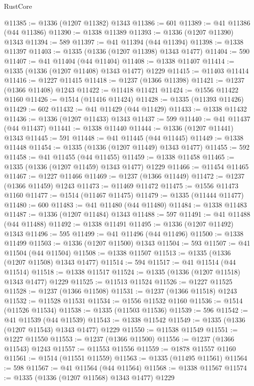 \begin{lexlean}{RustCore}
\begin{coremodule}
@11385 := @1336 (@1207 @11382) @1343
@11386 := 601
@11389 := @41 @11386 (@44 @11386)
@11390 := @1338 @11389
@11393 := @1336 (@1207 @11390) @1343
@11394 := 589
@11397 := @41 @11394 (@44 @11394)
@11398 := @1338 @11397
@11403 := @1335 (@1336 (@1207 @11398) @1343 @1477)
@11404 := 590
@11407 := @41 @11404 (@44 @11404)
@11408 := @1338 @11407
@11414 := @1335 (@1336 (@1207 @11408) @1343 @1477) @1229
@11415 := @11403 @11414
@11416 := @1227 @11415
@11418 := @1237 (@1366 @11398)
@11421 := @1237 (@1366 @11408) @1243
@11422 := @11418 @11421
@11424 := @1556 @11422 @1160
@11426 := @1514 (@11416 @11424)
@11428 := @1335 (@11393 @11426)
@11429 := 602
@11432 := @41 @11429 (@44 @11429)
@11433 := @1338 @11432
@11436 := @1336 (@1207 @11433) @1343
@11437 := 599
@11440 := @41 @11437 (@44 @11437)
@11441 := @1338 @11440
@11444 := @1336 (@1207 @11441) @1343
@11445 := 591
@11448 := @41 @11445 (@44 @11445)
@11449 := @1338 @11448
@11454 := @1335 (@1336 (@1207 @11449) @1343 @1477)
@11455 := 592
@11458 := @41 @11455 (@44 @11455)
@11459 := @1338 @11458
@11465 := @1335 (@1336 (@1207 @11459) @1343 @1477) @1229
@11466 := @11454 @11465
@11467 := @1227 @11466
@11469 := @1237 (@1366 @11449)
@11472 := @1237 (@1366 @11459) @1243
@11473 := @11469 @11472
@11475 := @1556 @11473 @1160
@11477 := @1514 (@11467 @11475)
@11479 := @1335 (@11444 @11477)
@11480 := 600
@11483 := @41 @11480 (@44 @11480)
@11484 := @1338 @11483
@11487 := @1336 (@1207 @11484) @1343
@11488 := 597
@11491 := @41 @11488 (@44 @11488)
@11492 := @1338 @11491
@11495 := @1336 (@1207 @11492) @1343
@11496 := 595
@11499 := @41 @11496 (@44 @11496)
@11500 := @1338 @11499
@11503 := @1336 (@1207 @11500) @1343
@11504 := 593
@11507 := @41 @11504 (@44 @11504)
@11508 := @1338 @11507
@11513 := @1335 (@1336 (@1207 @11508) @1343 @1477)
@11514 := 594
@11517 := @41 @11514 (@44 @11514)
@11518 := @1338 @11517
@11524 := @1335 (@1336 (@1207 @11518) @1343 @1477) @1229
@11525 := @11513 @11524
@11526 := @1227 @11525
@11528 := @1237 (@1366 @11508)
@11531 := @1237 (@1366 @11518) @1243
@11532 := @11528 @11531
@11534 := @1556 @11532 @1160
@11536 := @1514 (@11526 @11534)
@11538 := @1335 (@11503 @11536)
@11539 := 596
@11542 := @41 @11539 (@44 @11539)
@11543 := @1338 @11542
@11549 := @1335 (@1336 (@1207 @11543) @1343 @1477) @1229
@11550 := @11538 @11549
@11551 := @1227 @11550
@11553 := @1237 (@1366 @11500)
@11556 := @1237 (@1366 @11543) @1243
@11557 := @11553 @11556
@11559 := @1878 @11557 @1160
@11561 := @1514 (@11551 @11559)
@11563 := @1335 (@11495 @11561)
@11564 := 598
@11567 := @41 @11564 (@44 @11564)
@11568 := @1338 @11567
@11574 := @1335 (@1336 (@1207 @11568) @1343 @1477) @1229

\end{coremodule}
\end{lexlean}
